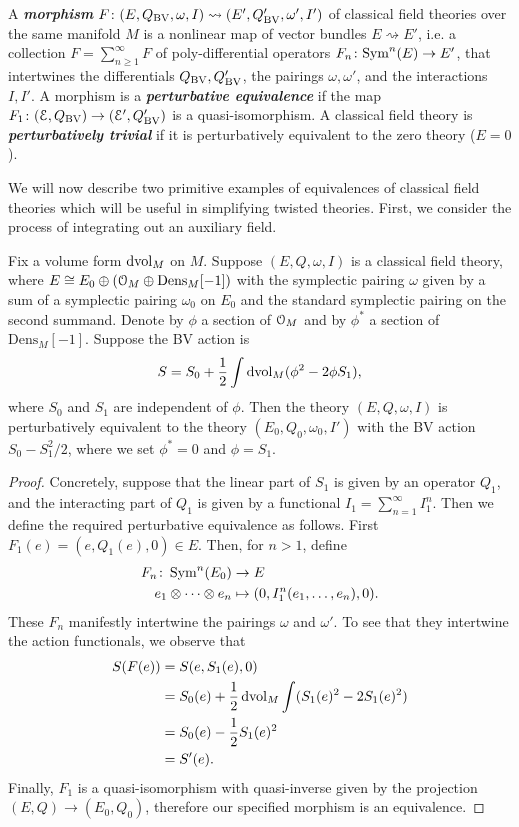 \documentclass[10pt, oneside]{article}
\newcommand{\Dens}{\mathrm{Dens}}
\newcommand{\defterm}[1]{\textbf{\emph{#1}}}
\begin{document}
\begin{definition}
A \defterm{morphism} $F\colon (E, Q_{\mathrm{BV}}, \omega, I) \rightsquigarrow (E', Q_{\mathrm{BV}}', \omega', I')$ of classical field theories over the same manifold $M$ is a nonlinear map of vector bundles $E\rightsquigarrow E'$, i.e. a collection $F=\sum_{n\geq 1}^\infty F$ of poly-differential operators $F_n\colon {\rm Sym}^n(E)\rightarrow E'$, that intertwines the differentials $Q_{\mathrm{BV}}, Q_{\mathrm{BV}}'$, the pairings $\omega, \omega'$, and the interactions $I,I'$. A morphism is a \defterm{perturbative equivalence} if the map $F_1\colon (\mathcal E, Q_{\mathrm{BV}})\rightarrow (\mathcal E', Q_{\mathrm{BV}}')$ is a quasi-isomorphism. A classical field theory is \defterm{perturbatively trivial} if it is perturbatively equivalent to the zero theory ($E = 0$).
\end{definition}

We will now describe two primitive examples of equivalences of classical field theories which will be useful in simplifying twisted theories. First, we consider the process of integrating out an auxiliary field.

\begin{prop}
Fix a volume form $\operatorname{dvol}_M$ on $M$. Suppose $(E, Q, \omega, I)$ is a classical field theory, where $E\cong E_0\oplus (\cO_M\oplus \Dens_M[-1])$ with the symplectic pairing $\omega$ given by a sum of a symplectic pairing $\omega_0$ on $E_0$ and the standard symplectic pairing on the second summand. Denote by $\phi$ a section of $\mathcal O_M$ and by $\phi^*$ a section of $\Dens_M[-1]$. Suppose the BV action is
\[S = S_0 + \frac{1}{2} \int \operatorname{dvol}_M (\phi^2 - 2\phi S_1),\]
where $S_0$ and $S_1$ are independent of $\phi$. Then the theory $(E, Q, \omega, I)$ is perturbatively equivalent to the theory $(E_0, Q_0, \omega_0, I')$ with the BV action $S_0 - S_1^2/2$, where we set $\phi^* = 0$ and $\phi = S_1$.
\label{prop:integrateoutfield}
\end{prop}

\begin{proof}
Concretely, suppose that the linear part of $S_1$ is given by an operator $Q_1$, and the interacting part of $Q_1$ is given by a functional $I_1 = \sum_{n=1}^\infty I_1^n$.  Then we define the required perturbative equivalence as follows.  First $F_1(e) = (e, Q_1(e), 0) \in E$.  Then, for $n > 1$, define
\begin{align*}
F_n \colon \operatorname{Sym}^n(E_0) &\to E \\
e_1 \otimes \cdots \otimes e_n &\mapsto (0, I_1^n(e_1, \ldots, e_n), 0).
\end{align*}
These $F_n$ manifestly intertwine the pairings $\omega$ and $\omega'$.  To see that they intertwine the action functionals, we observe that 
\begin{align*}
S(F(e)) &= S(e, S_1(e), 0) \\
&= S_0(e) + \frac 12 \operatorname{dvol}_M \int (S_1(e)^2 - 2 S_1(e)^2) \\
&= S_0(e) - \frac 12 S_1(e)^2 \\
&= S'(e).
\end{align*}
Finally, $F_1$ is a quasi-isomorphism with quasi-inverse given by the projection $(E,Q) \to (E_0,Q_0)$, therefore our specified morphism is an equivalence.
\end{proof}
\end{document}
